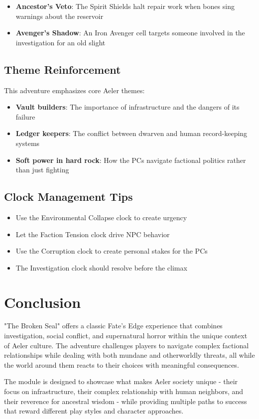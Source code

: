 \documentclass[11pt]{article}
\begin{document}
\begin{itemize}
\item \textbf{Ancestor's Veto}: The Spirit Shields halt repair work when bones sing warnings about the reservoir
\item \textbf{Avenger's Shadow}: An Iron Avenger cell targets someone involved in the investigation for an old slight
\end{itemize}

\subsection{Theme Reinforcement}

This adventure emphasizes core Aeler themes:
\begin{itemize}
\item \textbf{Vault builders}: The importance of infrastructure and the dangers of its failure
\item \textbf{Ledger keepers}: The conflict between dwarven and human record-keeping systems
\item \textbf{Soft power in hard rock}: How the PCs navigate factional politics rather than just fighting
\end{itemize}

\subsection{Clock Management Tips}

\begin{itemize}
\item Use the Environmental Collapse clock to create urgency
\item Let the Faction Tension clock drive NPC behavior
\item Use the Corruption clock to create personal stakes for the PCs
\item The Investigation clock should resolve before the climax
\end{itemize}

\section{Conclusion}

"The Broken Seal" offers a classic Fate's Edge experience that combines investigation, social conflict, and supernatural horror within the unique context of Aeler culture. The adventure challenges players to navigate complex factional relationships while dealing with both mundane and otherworldly threats, all while the world around them reacts to their choices with meaningful consequences.

The module is designed to showcase what makes Aeler society unique - their focus on infrastructure, their complex relationship with human neighbors, and their reverence for ancestral wisdom - while providing multiple paths to success that reward different play styles and character approaches.
\end{document}
